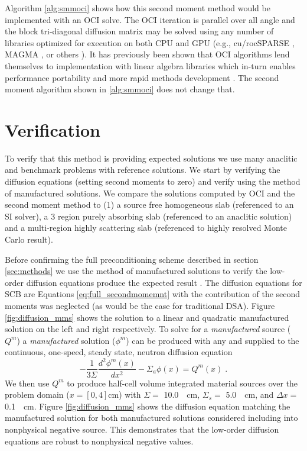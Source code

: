Algorithm \ref{alg:smmoci} shows how this second moment method would be implemented with an OCI solve.
The OCI iteration is parallel over all angle and the block tri-diagonal diffusion matrix may be solved using any number of libraries optimized for execution on both CPU and GPU (e.g., cu/rocSPARSE \cite{cusparse, rocsparse}, MAGMA \cite{magma}, or others \cite{liwen_2012_solveable, klein_2023_tridiag}).
It has previously been shown that OCI algorithms lend themselves to implementation with linear algebra libraries which in-turn enables performance portability and more rapid methods development \cite{morgan_2025_oci}.
The second moment algorithm shown in \ref{alg:smmoci} does not change that.


\section{Verification}

To verify that this method is providing expected solutions we use many anaclitic and benchmark problems with reference solutions.
We start by verifying the diffusion equations (setting second moments to zero) and verify using the method of manufactured solutions.
We compare the solutions computed by OCI and the second moment method to (1) a source free homogeneous slab (referenced to an SI solver), a 3 region purely absorbing slab (referenced to an anaclitic solution) and a multi-region highly scattering slab (referenced to highly resolved Monte Carlo result). 

Before confirming the full preconditioning scheme described in section \ref{sec:methods} we use the method of manufactured solutions to verify the low-order diffusion equations produce the expected result \cite{warsa_mms_2010, moosemms}.
The diffusion equations for SCB are Equations \ref{eq:full_secondmomemnt} with the contribution of the second moments was neglected (as would be the case for traditional DSA).
Figure \ref{fig:diffusion_mms} shows the solution to a linear and quadratic manufactured solution on the left and right respectively.
To solve for a \textit{manufactured} source ($Q^m$) a \textit{manufactured} solution ($\phi^m$) can be produced with any and supplied to the continuous, one-speed, steady state, neutron diffusion equation
\begin{equation}
    -\frac{1}{3\Sigma}\frac{d^2\phi^m(x)}{dx^2} - \Sigma_a\phi(x)  = Q^m(x) \;.
\end{equation}
We then use $Q^m$ to produce half-cell volume integrated material sources over the problem domain ($x=[0,4]$\unit{\centi\meter}) with $\Sigma =$ \SI{10.0}{\per\centi\meter}, $\Sigma_s =$ \SI{5.0}{\per\centi\meter}, and $\Delta x =$ \SI{0.1}{\per\centi\meter}.
Figure \ref{fig:diffusion_mms} shows the diffusion equation matching the manufactured solution for both manufactured solutions considered including into nonphysical negative source.
This demonstrates that the low-order diffusion equations are robust to nonphysical negative values.

